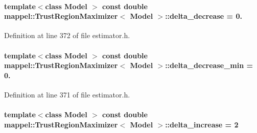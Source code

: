 \paragraph[{\texorpdfstring{delta\+\_\+decrease}{delta_decrease}}]{\setlength{\rightskip}{0pt plus 5cm}template$<$class Model $>$ const double {\bf mappel\+::\+Trust\+Region\+Maximizer}$<$ Model $>$\+::delta\+\_\+decrease = 0.\hspace{0.3cm}{\ttfamily [static]}}\hypertarget{classmappel_1_1TrustRegionMaximizer_a0b268fcfb5cdda85ee8b572a88be2751}{}\label{classmappel_1_1TrustRegionMaximizer_a0b268fcfb5cdda85ee8b572a88be2751}


Definition at line 372 of file estimator.\+h.

\paragraph[{\texorpdfstring{delta\+\_\+decrease\+\_\+min}{delta_decrease_min}}]{\setlength{\rightskip}{0pt plus 5cm}template$<$class Model $>$ const double {\bf mappel\+::\+Trust\+Region\+Maximizer}$<$ Model $>$\+::delta\+\_\+decrease\+\_\+min = 0.\hspace{0.3cm}{\ttfamily [static]}}\hypertarget{classmappel_1_1TrustRegionMaximizer_ab1d057688e8dbc766571e768df4b4171}{}\label{classmappel_1_1TrustRegionMaximizer_ab1d057688e8dbc766571e768df4b4171}


Definition at line 371 of file estimator.\+h.

\paragraph[{\texorpdfstring{delta\+\_\+increase}{delta_increase}}]{\setlength{\rightskip}{0pt plus 5cm}template$<$class Model $>$ const double {\bf mappel\+::\+Trust\+Region\+Maximizer}$<$ Model $>$\+::delta\+\_\+increase = 2\hspace{0.3cm}{\ttfamily [static]}}\hypertarget{classmappel_1_1TrustRegionMaximizer_a381f19cef538aee3fbaca20d0378c941}{}\label{classmappel_1_1TrustRegionMaximizer_a381f19cef538aee3fbaca20d0378c941}


